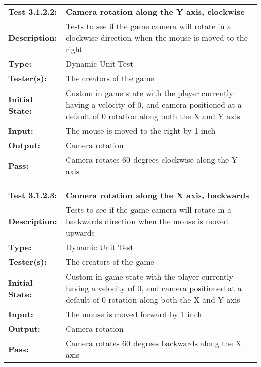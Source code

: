 \documentclass[12pt, titlepage]{article}
\begin{document}
\begin{enumerate}
\begin{mdframed}[linewidth=1pt]
\begin{tabularx}{\textwidth}{@{}p{3cm}X@{}}
{\bf Test 3.1.2.2:} & {\bf Camera rotation along the Y axis, clockwise}\\[\baselineskip]
{\bf Description:} & Tests to see if the game camera will rotate in a clockwise direction when the mouse is moved to the right\\[0.5\baselineskip]
{\bf Type:} & Dynamic Unit Test\\[0.5\baselineskip]
{\bf Tester(s):} & The creators of the game\\[0.5\baselineskip]
{\bf Initial State:} & Custom in game state with the player currently having a velocity of 0, and camera positioned at a default of 0 rotation along both the X and Y axis\\[0.5\baselineskip]
{\bf Input:} & The mouse is moved to the right by 1 inch\\[0.5\baselineskip]
{\bf Output:} & Camera rotation\\[0.5\baselineskip]
{\bf Pass:} & Camera rotates 60 degrees clockwise along the Y axis
\end{tabularx}
\end{mdframed}

\begin{mdframed}[linewidth=1pt]
\begin{tabularx}{\textwidth}{@{}p{3cm}X@{}}
{\bf Test 3.1.2.3:} & {\bf Camera rotation along the X axis, backwards}\\[\baselineskip]
{\bf Description:} & Tests to see if the game camera will rotate in a backwards direction when the mouse is moved upwards\\[0.5\baselineskip]
{\bf Type:} & Dynamic Unit Test\\[0.5\baselineskip]
{\bf Tester(s):} & The creators of the game\\[0.5\baselineskip]
{\bf Initial State:} & Custom in game state with the player currently having a velocity of 0, and camera positioned at a default of 0 rotation along both the X and Y axis\\[0.5\baselineskip]
{\bf Input:} & The mouse is moved forward by 1 inch\\[0.5\baselineskip]
{\bf Output:} & Camera rotation\\[0.5\baselineskip]
{\bf Pass:} & Camera rotates 60 degrees backwards along the X axis
\end{tabularx}
\end{mdframed}


\end{enumerate}
\end{document}

